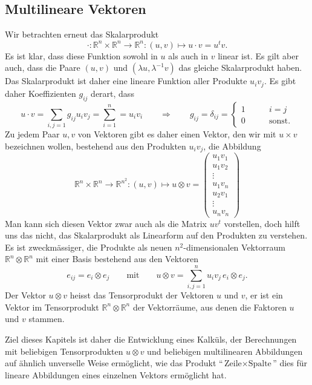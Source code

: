 \subsection{Multilineare Vektoren%
\label{subsection:multilinearevektoren}}
Wir betrachten erneut das Skalarprodukt
\[
\cdot\colon
\mathbb R^n \times \mathbb R^n \to \mathbb R^n
:
(u,v)\mapsto u\cdot v= u^t v.
\]
Es ist klar, dass diese Funktion sowohl in $u$ als auch in $v$ linear ist.
Es gilt aber auch, dass die Paare $(u,v)$ und $(\lambda u,\lambda^{-1} v)$
das gleiche Skalarprodukt haben.
Das Skalarprodukt ist daher eine lineare Funktion aller Produkte $u_iv_j$.
Es gibt daher Koeffizienten $g_{ij}$ derart, dass
\[
u\cdot v
=
\sum_{i,j=1}g_{ij}u_iv_j
=
\sum_{i=1}^n = u_iv_i
\qquad\Rightarrow\qquad
g_{ij}=\delta_{ij}
=
\begin{cases}
1&\qquad i=j\\
0&\qquad\text{sonst.}
\end{cases}
\]
Zu jedem Paar $u,v$ von Vektoren gibt es daher einen Vektor, den wir mit
$u\times v$ bezeichnen wollen, bestehend
aus den Produkten $u_iv_j$, die Abbildung
\[
\mathbb R^n\times \mathbb R^n
\to
\mathbb R^{n^2}
:
(u,v)\mapsto
u\otimes v
=
\begin{pmatrix}
u_1v_1\\u_1v_2\\\vdots\\u_1v_n\\u_2v_1\\\vdots\\u_nv_n
\end{pmatrix}
\]
Man kann sich diesen Vektor zwar auch als die Matrix $uv^t$ vorstellen,
doch hilft uns das nicht, das Skalarprodukt als Linearform
auf den Produkten zu verstehen.
Es ist zweckmässiger, die Produkte als neuen $n^2$-dimensionalen Vektorraum
$\mathbb R^n \otimes \mathbb R^n$ mit einer Basis bestehend aus den 
Vektoren
\[
e_{ij}
=
e_i\otimes e_j
\qquad\text{mit}\qquad
u\otimes v = \sum_{i,j=1}^n u_iv_j\, e_i\otimes e_j.
\]
Der Vektor $u\otimes v$ heisst das Tensorprodukt der Vektoren $u$ und $v$,
er ist ein Vektor im Tensorprodukt $\mathbb R^n\otimes \mathbb R^n$
der Vektorräume, aus denen die Faktoren $u$ und $v$ stammen.

Ziel dieses Kapitels ist daher die Entwicklung eines Kalküls, der 
Berechnungen mit beliebigen Tensorprodukten $u\otimes v$ und beliebigen
multilinearen Abbildungen auf ähnlich unverselle Weise ermöglicht,
wie das Produkt ``$\text{Zeile}\times\text{Spalte}$'' dies für lineare
Abbildungen eines einzelnen Vektors ermöglicht hat.



